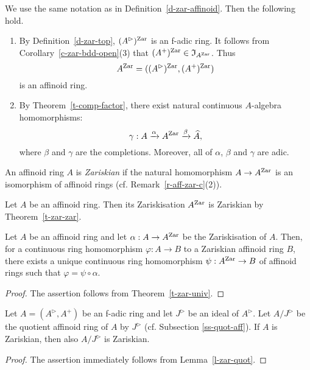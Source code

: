 \begin{rem}\label{r-aff-zar-c}
We use the same notation as in Definition~\ref{d-zar-affinoid}. 
Then the following hold. 
\begin{enumerate}
\item 
By Definition~\ref{d-zar-top}, 
$(A^{\rhd})^{{\operatorname{Zar}}}$ is an f-adic ring. 
It follows from Corollary~\ref{c-zar-bdd-open}(3) that 
$(A^+)^{{\operatorname{Zar}}} \in \mathfrak I_{A^{{\operatorname{Zar}}}}$. 
Thus 
$$A^{{\operatorname{Zar}}}=((A^{\rhd})^{{\operatorname{Zar}}}, (A^+)^{{\operatorname{Zar}}})$$ 
is an affinoid ring. 
\item 
By Theorem~\ref{t-comp-factor}, there exist natural continuous $A$-algebra homomorphisms: 
$$\gamma:A \xrightarrow{\alpha} A^{{\operatorname{Zar}}} \xrightarrow{\beta} \widehat{A},$$
where $\beta$ and $\gamma$ are the completions. 
Moreover, all of $\alpha$, $\beta$ and $\gamma$ are adic. 
\end{enumerate}
\end{rem}




\begin{dfn}
An affinoid ring $A$ is {\em Zariskian} if 
the natural homomorphism $A \to A^{{\operatorname{Zar}}}$ is an isomorphism 
of affinoid rings  
(cf. Remark~\ref{r-aff-zar-c}(2)). 
\end{dfn}

\begin{rem}\label{r-zar-zar}
Let $A$ be an affinoid ring. 
Then its Zariskisation $A^{{\operatorname{Zar}}}$ is 
Zariskian by Theorem~\ref{t-zar-zar}. 
\end{rem}




\begin{prop}\label{p-zar-univ}
Let $A$ be an affinoid ring and 
let $\alpha:A \to A^{{\operatorname{Zar}}}$ be the Zariskisation of $A$. 
Then, for a continuous ring homomorphism $\varphi:A \to B$ 
to a Zariskian affinoid ring $B$, 
there  exists a unique continuous ring homomorphism 
$\psi:A^{{\operatorname{Zar}}} \to B$ of affinoid rings such that 
$\varphi=\psi \circ \alpha$. 
\end{prop}

\begin{proof}
The assertion follows from Theorem~\ref{t-zar-univ}. 
\end{proof}


\begin{lem}\label{l-zar-quot2}
Let $A=(A^{\rhd}, A^+)$ be an f-adic ring and let $J^{\rhd}$ 
be an ideal of $A^{\rhd}$. 
Let $A/J^{\rhd}$ be the quotient affinoid ring of $A$ by $J^{\rhd}$ (cf. Subsection \ref{ss-quot-aff}). 
If $A$ is Zariskian, then also $A/J^{\rhd}$ is Zariskian. 
\end{lem}

\begin{proof}
The assertion immediately follows from Lemma~\ref{l-zar-quot}. 
\end{proof}
